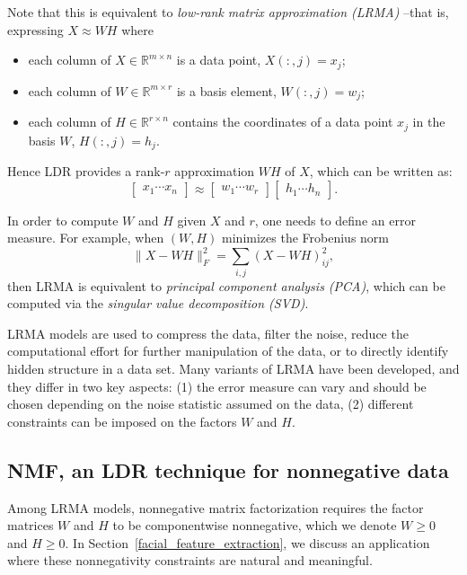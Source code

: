 \documentclass{amsart}
\newcommand{\R}{\mathbb{R}}
\begin{document}
Note that this is equivalent to {\it low-rank matrix approximation (LRMA)} --that is, expressing $X \approx WH$ where
\begin{itemize}
    \item each column of $X\in\R^{m\times n}$ is a data point, $X(:,j)=x_j$;
    \item each column of $W\in\R^{m\times r}$ is a basis element, $W(:,j)=w_j$;
    \item each column of $H\in\R^{r\times n}$ contains the coordinates of a data point $x_j$ in the basis $W$, $H(:,j)=h_j$.
\end{itemize}
Hence LDR provides a rank-$r$ approximation $WH$ of $X$, which can be written as:
\[
    \begin{bmatrix} x_1 \cdots x_n \end{bmatrix} \approx
    \begin{bmatrix} w_1 \cdots w_r \end{bmatrix}
    \begin{bmatrix} h_1 \cdots h_n \end{bmatrix}.
\]

\bigskip

In order to compute $W$ and $H$ given $X$ and $r$, one needs to define an error measure. For example, when $(W,H)$ minimizes the Frobenius norm
\[  
    \|X-WH\|_F^2 = \sum_{i,j} (X-WH)_{ij}^2,
\]
then LRMA is equivalent to {\it principal component analysis (PCA)}, which can be computed via the {\it singular value decomposition (SVD)}.

\bigskip

LRMA models are used to compress the data, filter the noise, reduce the computational effort for further manipulation of the data, or to directly identify hidden structure in a data set. Many variants of LRMA have been developed, and they differ in two key aspects: (1) the error measure can vary and should be chosen depending on the noise statistic assumed on the data,
(2) different constraints can be imposed on the factors $W$ and $H$.

\subsection{NMF, an LDR technique for nonnegative data}

Among LRMA models, nonnegative matrix factorization requires the factor matrices $W$ and $H$ to be componentwise nonnegative, which we denote $W\geq 0$ and $H\geq 0$. In Section~\ref{facial_feature_extraction}, we discuss an application where these nonnegativity constraints are natural and meaningful.
\end{document}
